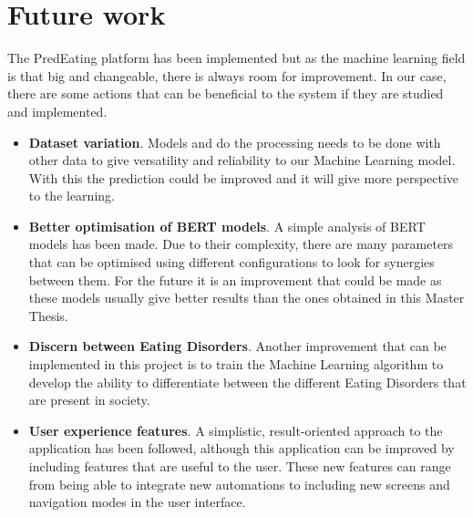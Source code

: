 \section{Future work}
The PredEating platform has been implemented but as the machine learning field is that big and changeable, there is always room for improvement. In our case, there are some actions that can be beneficial to the system if they are studied and implemented.
\begin{itemize}
    \item \textbf{Dataset variation}. Models and do the processing needs to be done with other data to give versatility and reliability to our Machine Learning model. With this the prediction could be improved and it will give more perspective to the learning.
    \item \textbf{Better optimisation of BERT models}. A simple analysis of BERT models has been made. Due to their complexity, there are many parameters that can be optimised using different configurations to look for synergies between them. For the future it is an improvement that could be made as these models usually give better results than the ones obtained in this Master Thesis.
    \item \textbf{Discern between Eating Disorders}. Another improvement that can be implemented in this project is to train the Machine Learning algorithm to develop the ability to differentiate between the different Eating Disorders that are present in society.
    \item \textbf{User experience features}. A simplistic, result-oriented approach to the application has been followed, although this application can be improved by including features that are useful to the user. These new features can range from being able to integrate new automations to including new screens and navigation modes in the user interface.
\end{itemize}

